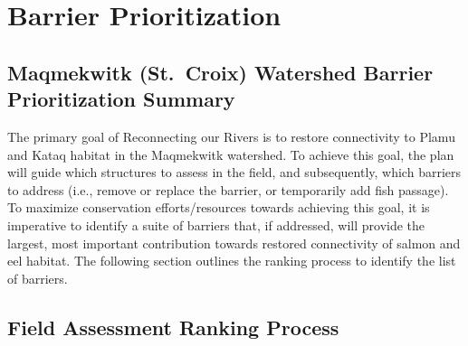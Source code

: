 \documentclass[
  letterpaper,
  DIV=11,
  numbers=noendperiod]{scrreprt}
\begin{document}

\chapter*{Barrier Prioritization}\label{barrier-prioritization}


\section*{Maqmekwitk (St.~Croix) Watershed Barrier Prioritization
Summary}\label{maqmekwitk-st.-croix-watershed-barrier-prioritization-summary}


The primary goal of Reconnecting our Rivers is to restore connectivity
to Plamu and Kataq habitat in the Maqmekwitk watershed. To achieve this
goal, the plan will guide which structures to assess in the field, and
subsequently, which barriers to address (i.e., remove or replace the
barrier, or temporarily add fish passage). To maximize conservation
efforts/resources towards achieving this goal, it is imperative to
identify a suite of barriers that, if addressed, will provide the
largest, most important contribution towards restored connectivity of
salmon and eel habitat. The following section outlines the ranking
process to identify the list of barriers.

\section*{Field Assessment Ranking
Process}\label{field-assessment-ranking-process}

\end{document}

